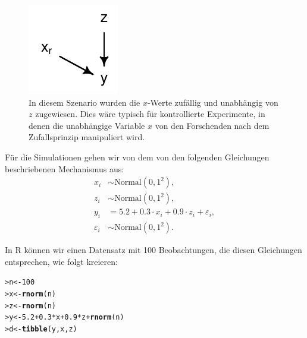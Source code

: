 \documentclass[oneside, 10pt]{book}\usepackage[]{graphicx}\usepackage[]{xcolor}
\makeatletter
\newcommand{\hlnum}[1]{\textcolor[rgb]{0.686,0.059,0.569}{#1}}%
\newcommand{\hlopt}[1]{\textcolor[rgb]{0,0,0}{#1}}%
\newcommand{\hlstd}[1]{\textcolor[rgb]{0.345,0.345,0.345}{#1}}%
\newcommand{\hlkwb}[1]{\textcolor[rgb]{0.69,0.353,0.396}{#1}}%
\newcommand{\hlkwd}[1]{\textcolor[rgb]{0.737,0.353,0.396}{\textbf{#1}}}%
\newenvironment{kframe}{%
 \def\at@end@of@kframe{}%
 \ifinner\ifhmode%
  \def\at@end@of@kframe{\end{minipage}}%
  \begin{minipage}{\columnwidth}%
 \fi\fi%
 \def\FrameCommand##1{\hskip\@totalleftmargin \hskip-\fboxsep
 \colorbox{shadecolor}{##1}\hskip-\fboxsep
     \hskip-\linewidth \hskip-\@totalleftmargin \hskip\columnwidth}%
 \MakeFramed {\advance\hsize-\width
   \@totalleftmargin\z@ \linewidth\hsize
   \@setminipage}}%
 {\par\unskip\endMakeFramed%
 \at@end@of@kframe}
\newenvironment{knitrout}{}{} %
\makeatother
\begin{document}
\begin{knitrout}
\color{fgcolor}\begin{figure}[tp]

{\centering \includegraphics[width=.2\textwidth]{figs/unnamed-chunk-316-1} 

}

\caption{In diesem Szenario wurden die $x$-Werte zufällig und unabhängig von $z$ zugewiesen. Dies wäre typisch für kontrollierte Experimente, in denen die unabhängige Variable $x$ von den Forschenden nach dem Zufallsprinzip manipuliert wird.\label{fig:dag2}}\label{fig:unnamed-chunk-316}
\end{figure}

\end{knitrout}

Für die Simulationen gehen wir von dem von den folgenden Gleichungen
beschriebenen Mechanismus aus:
\begin{align}
x_i &\sim \textrm{Normal}(0, 1^2), \nonumber \\
z_i &\sim \textrm{Normal}(0, 1^2), \nonumber \\
y_i &= 5.2 + 0.3\cdot x_i + 0.9 \cdot z_i + \varepsilon_i, \label{eq:dag2} \\
\varepsilon_i &\sim \textrm{Normal}(0, 1^2). \nonumber
\end{align}

In R können wir einen Datensatz mit 100 Beobachtungen, die diesen Gleichungen entsprechen,
wie folgt kreieren:
\begin{knitrout}
\color{fgcolor}\begin{kframe}
\begin{alltt}
\hlstd{> }\hlstd{n} \hlkwb{<-} \hlnum{100}
\hlstd{> }\hlstd{x} \hlkwb{<-} \hlkwd{rnorm}\hlstd{(n)}
\hlstd{> }\hlstd{z} \hlkwb{<-} \hlkwd{rnorm}\hlstd{(n)}
\hlstd{> }\hlstd{y} \hlkwb{<-} \hlnum{5.2} \hlopt{+} \hlnum{0.3}\hlopt{*}\hlstd{x} \hlopt{+} \hlnum{0.9}\hlopt{*}\hlstd{z} \hlopt{+} \hlkwd{rnorm}\hlstd{(n)}
\hlstd{> }\hlstd{d} \hlkwb{<-} \hlkwd{tibble}\hlstd{(y, x, z)}
\end{alltt}
\end{kframe}
\end{knitrout}
\end{document}
